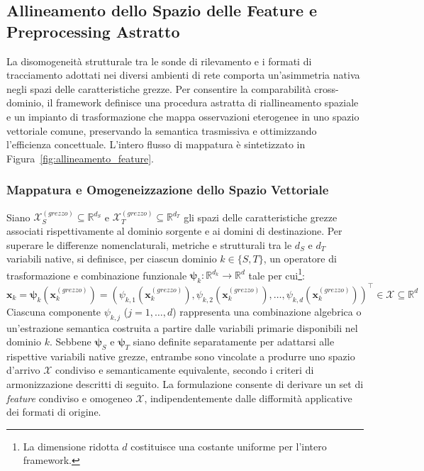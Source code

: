 \subsection{Allineamento dello Spazio delle Feature e Preprocessing Astratto}
\label{subsec:allineamento_feature}

La disomogeneità strutturale tra le sonde di rilevamento e i formati di tracciamento adottati nei diversi ambienti di rete comporta un'asimmetria nativa negli spazi delle caratteristiche grezze. Per consentire la comparabilità cross-dominio, il framework definisce una procedura astratta di riallineamento spaziale e un impianto di trasformazione che mappa osservazioni eterogenee in uno spazio vettoriale comune, preservando la semantica trasmissiva e ottimizzando l'efficienza concettuale. L'intero flusso di mappatura è sintetizzato in Figura~\ref{fig:allineamento_feature}.

\subsubsection{Mappatura e Omogeneizzazione dello Spazio Vettoriale}
\label{subsubsec:mappatura_feature}
Siano $\mathcal{X}_S^{(grezzo)} \subseteq \mathbb{R}^{d_S}$ e $\mathcal{X}_T^{(grezzo)} \subseteq \mathbb{R}^{d_T}$ gli spazi delle caratteristiche grezze associati rispettivamente al dominio sorgente e ai domini di destinazione. Per superare le differenze nomenclaturali, metriche e strutturali tra le $d_S$ e $d_T$ variabili native, si definisce, per ciascun dominio $k \in \{S, T\}$, un operatore di trasformazione e combinazione funzionale $\boldsymbol{\psi}_k: \mathbb{R}^{d_k} \rightarrow \mathbb{R}^d$ tale per cui\footnote{La dimensione ridotta $d$ costituisce una costante uniforme per l'intero framework.}:
\begin{equation}
    \mathbf{x}_k = \boldsymbol{\psi}_k(\mathbf{x}_k^{(grezzo)}) = \left( \psi_{k,1}(\mathbf{x}_k^{(grezzo)}), \psi_{k,2}(\mathbf{x}_k^{(grezzo)}), \dots, \psi_{k,d}(\mathbf{x}_k^{(grezzo)}) \right)^\top \in \mathcal{X} \subseteq \mathbb{R}^d
    \label{eq:feature_mapping}
\end{equation}
Ciascuna componente $\psi_{k,j}$ ($j = 1, \dots, d$) rappresenta una combinazione algebrica o un'estrazione semantica costruita a partire dalle variabili primarie disponibili nel dominio $k$. Sebbene $\boldsymbol{\psi}_S$ e $\boldsymbol{\psi}_T$ siano definite separatamente per adattarsi alle rispettive variabili native grezze, entrambe sono vincolate a produrre uno spazio d'arrivo $\mathcal{X}$ condiviso e semanticamente equivalente, secondo i criteri di armonizzazione descritti di seguito. La formulazione consente di derivare un set di \textit{feature} condiviso e omogeneo $\mathcal{X}$, indipendentemente dalle difformità applicative dei formati di origine.

